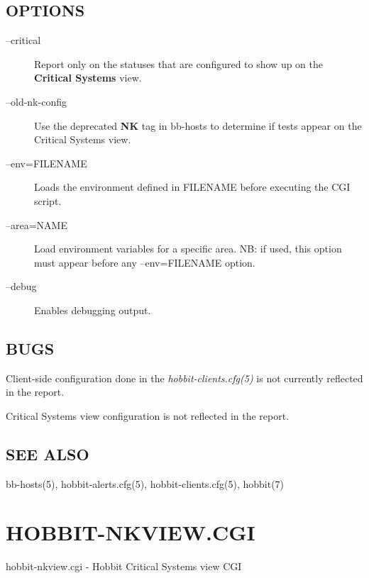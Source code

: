 \subsection{OPTIONS}
\begin{description}
\item[--critical] Report only on the statuses that are configured to
  show up on the \textbf{Critical Systems} view. 

 

\item[--old-nk-config] Use the deprecated \textbf{NK}
 tag in bb-hosts to determine if tests appear on the Critical Systems view. 

 

\item[--env=FILENAME] Loads the environment defined in FILENAME before
  executing the CGI script. 


 

\item[--area=NAME] Load environment variables for a specific area. NB:
  if used, this option must appear before any --env=FILENAME option. 


\item[--debug] Enables debugging output. 

 

\end{description}
\subsection{BUGS}
 Client-side configuration done in the \emph{hobbit-clients.cfg(5)}
 is not currently reflected in the report. 

  Critical Systems view configuration is not reflected in the report. 


 
\subsection{SEE ALSO}
bb-hosts(5), hobbit-alerts.cfg(5), hobbit-clients.cfg(5), hobbit(7) 


%
\newpage
\section{HOBBIT-NKVIEW.CGI}


 hobbit-nkview.cgi - Hobbit Critical Systems view CGI 

